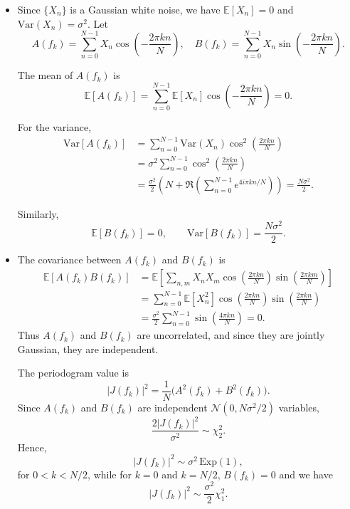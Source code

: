 \documentclass[11pt]{article}
\begin{document}
\begin{solution}
\begin{itemize}

\item Since $\{X_n\}$ is a Gaussian white noise, we have $\mathbb{E}[X_n] = 0$ and $\mathrm{Var}(X_n) = \sigma^2$.  
Let
\[
A(f_k) = \sum_{n=0}^{N-1} X_n \cos\!\left(-\frac{2\pi k n}{N}\right),
\quad
B(f_k) = \sum_{n=0}^{N-1} X_n \sin\!\left(-\frac{2\pi k n}{N}\right).
\]

The mean of \(A(f_k)\) is
\[
\mathbb{E}[A(f_k)] = \sum_{n=0}^{N-1} \mathbb{E}[X_n] \cos\!\left(-\frac{2\pi k n}{N}\right) = 0.
\]

For the variance,
\[
\begin{aligned}
\mathrm{Var}[A(f_k)]
&= \sum_{n=0}^{N-1} \mathrm{Var}(X_n) \cos^2\!\left(\frac{2\pi k n}{N}\right)\\
&= \sigma^2 \sum_{n=0}^{N-1} \cos^2\!\left(\frac{2\pi k n}{N}\right)\\
&= \frac{\sigma^2}{2} \!\left(N + \Re\!\left(\sum_{n=0}^{N-1} e^{4i\pi k n/N}\right)\right)
= \frac{N\sigma^2}{2}.
\end{aligned}
\]

Similarly,
\[
\mathbb{E}[B(f_k)] = 0, \qquad
\mathrm{Var}[B(f_k)] = \frac{N\sigma^2}{2}.
\]

\item The covariance between \(A(f_k)\) and \(B(f_k)\) is
\[
\begin{aligned}
\mathbb{E}[A(f_k)B(f_k)]
&= \mathbb{E}\!\left[\sum_{n,m} X_n X_m 
\cos\!\left(\frac{2\pi k n}{N}\right)
\sin\!\left(\frac{2\pi k m}{N}\right)\right]\\
&= \sum_{n=0}^{N-1} \mathbb{E}[X_n^2] 
\cos\!\left(\frac{2\pi k n}{N}\right)
\sin\!\left(\frac{2\pi k n}{N}\right)\\
&= \frac{\sigma^2}{2} \sum_{n=0}^{N-1} \sin\!\left(\frac{4\pi k n}{N}\right) = 0.
\end{aligned}
\]
Thus \(A(f_k)\) and \(B(f_k)\) are uncorrelated, and since they are jointly Gaussian, they are independent.

The periodogram value is
\[
|J(f_k)|^2 = \frac{1}{N}\big(A^2(f_k) + B^2(f_k)\big).
\]
Since \(A(f_k)\) and \(B(f_k)\) are independent \(\mathcal{N}(0, N\sigma^2/2)\) variables,
\[
\frac{2|J(f_k)|^2}{\sigma^2} \sim \chi^2_2.
\]
Hence,
\[
|J(f_k)|^2 \sim \sigma^2 \, \mathrm{Exp}(1),
\]
for \(0 < k < N/2\), while for \(k=0\) and \(k=N/2\), \(B(f_k)=0\) and we have
\[
|J(f_k)|^2 \sim \frac{\sigma^2}{2}\chi^2_1.
\]


\end{itemize}
\end{solution}
\end{document}
